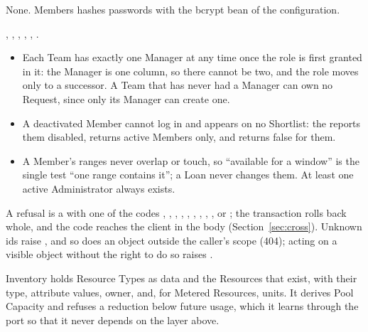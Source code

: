 {\sloppy None. Members hashes passwords with the bcrypt  bean of the  configuration.\par}

, , , , , .

\begin{itemize}
\item Each Team has exactly one Manager at any time once the role is first granted in it: the Manager is one column, so there cannot be two, and the role moves only to a successor. A Team that has never had a Manager can own no Request, since only its Manager can create one.
\item A deactivated Member cannot log in and appears on no Shortlist: the  reports them disabled,  returns active Members only, and  returns false for them.
\item A Member's ranges never overlap or touch, so ``available for a window'' is the single test ``one range contains it''; a Loan never changes them. At least one active Administrator always exists.
\end{itemize}

{\sloppy A refusal is a  with one of the codes , , , , , , , , , or ; the transaction rolls back whole, and the code reaches the client in the  body (Section~\ref{sec:cross}). Unknown ids raise , and so does an object outside the caller's scope (404); acting on a visible object without the right to do so raises .\par}


Inventory holds Resource Types as data and the Resources that exist, with their type, attribute values, owner, and, for Metered Resources, units. It derives Pool Capacity and refuses a reduction below future usage, which it learns through the port  so that it never depends on the layer above.

